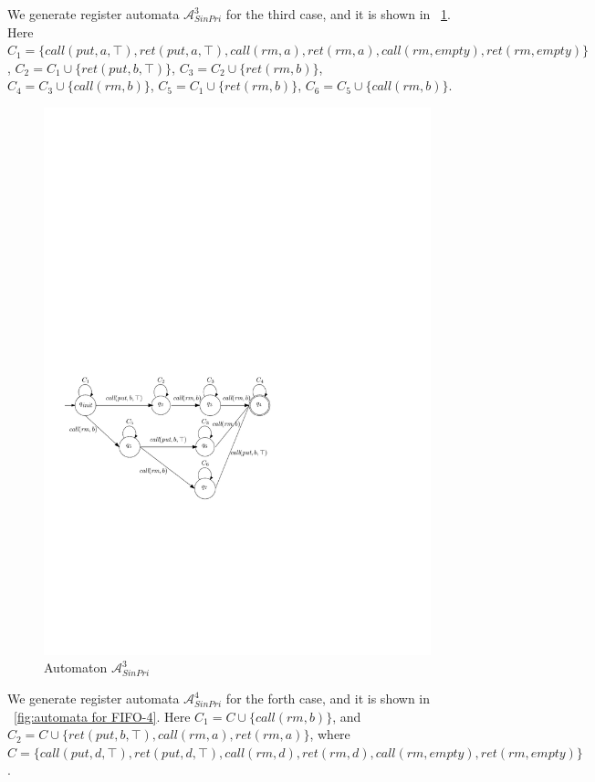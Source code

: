 We generate register automata $\mathcal{A}_{\textit{SinPri}}^3$ for the third case, and it is shown in \figurename~\ref{fig:automata for FIFO-3}. Here $C_1 = \{ \textit{call}(\textit{put},a,\top),\textit{ret}(\textit{put},a,\top), \textit{call}(\textit{rm},a),\textit{ret}(\textit{rm},a),\textit{call}(\textit{rm},\textit{empty}),\textit{ret}(\textit{rm},\textit{empty}) \}$, $C_2 = C_1 \cup \{ \textit{ret}(\textit{put},b,\top) \}$, $C_3 = C_2 \cup \{ \textit{ret}(\textit{rm},b) \}$, $C_4 = C_3 \cup \{ \textit{call}(\textit{rm},b) \}$, $C_5 = C_1 \cup \{ \textit{ret}(\textit{rm},b) \}$, $C_6 = C_5 \cup \{ \textit{call}(\textit{rm},b) \}$.

\begin{figure}[htbp]
  \centering
  \includegraphics[width=0.7 \textwidth]{figures/PIC_AUTO_FIFO_3.pdf}
  \caption{Automaton $\mathcal{A}_{\textit{SinPri}}^3$}
  \label{fig:automata for FIFO-3}
\end{figure}

We generate register automata $\mathcal{A}_{\textit{SinPri}}^4$ for the forth case, and it is shown in \figurename~\ref{fig:automata for FIFO-4}. Here $C_1 = C \cup \{ \textit{call}(\textit{rm},b) \}$, and $C_2 = C \cup \{ \textit{ret}(\textit{put},b,\top), \textit{call}(\textit{rm},a), \textit{ret}(\textit{rm},a) \}$, where $C = \{ \textit{call}(\textit{put},d,\top),\textit{ret}(\textit{put},d,\top), \textit{call}(\textit{rm},d),\textit{ret}(\textit{rm},d),\textit{call}(\textit{rm},\textit{empty}),\textit{ret}(\textit{rm},\textit{empty}) \}$.

